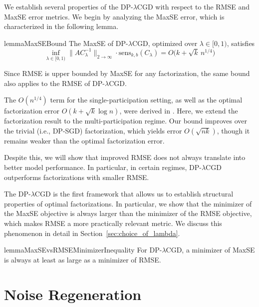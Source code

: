 \documentclass{article}
\theoremstyle{plain}
\theoremstyle{definition}
\theoremstyle{remark}
\newcommand{\method}{DP-$\lambda$CGD\xspace}
\begin{document}
We establish several properties of the \method with respect to the RMSE and MaxSE error
metrics. We begin by analyzing the MaxSE error, which is characterized in the following
lemma.

\begin{restatable}{lemma}{MaxSEBound}
\label{lem:MaxSEBound}
The MaxSE of \method, optimized over $\lambda \in [0,1)$, satisfies
\begin{equation}
    \!\!\inf_{\lambda \in [0,1)}\!\!
    \|A C_{\lambda}^{-1}\|_{2 \to \infty}
    \cdot \mathrm{sens}_{k,b}(C_{\lambda})
    = O\!\big(k + \sqrt{k}\, n^{1/4}\big) 
\end{equation}
\end{restatable}

Since RMSE is upper bounded by MaxSE for any factorization, the same bound also applies to
the RMSE of \method. 

The $O(n^{1/4})$ term for the single-participation setting, as well as the optimal factorization error $O(k+\sqrt{k}\log n)$, were derived in \citet{kalinin2025back}. Here, we extend the factorization result to the multi-participation regime. Our bound improves over the trivial (i.e., DP-SGD) factorization, which yields error $O(\sqrt{nk})$, though it remains weaker than the optimal factorization error.


Despite this, we will show that improved RMSE does not always translate into better model
performance. In particular, in certain regimes, \method outperforms factorizations with
smaller RMSE.

The \method is the first framework that allows us to establish structural properties of
optimal factorizations. In particular, we show that the minimizer of the MaxSE objective is
always larger than the minimizer of the RMSE objective, which makes RMSE a more practically
relevant metric. We discuss this phenomenon in detail in
Section~\ref{sec:choice_of_lambda}.


\begin{restatable}{lemma}{MaxSEvsRMSEMinimizerInequality}
\label{lem:method_minimizer_inequality}
For \method, a minimizer of MaxSE is always at least as large as a minimizer of RMSE.
\end{restatable}


\section{Noise Regeneration}
\label{sec:noise_regeneration}
\end{document}
